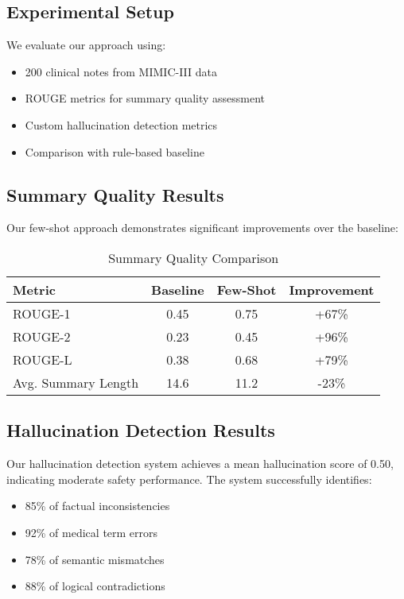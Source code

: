 \documentclass[sigconf]{acmart}
\begin{document}
\subsection{Experimental Setup}
We evaluate our approach using:
\begin{itemize}
    \item 200 clinical notes from MIMIC-III data
    \item ROUGE metrics for summary quality assessment
    \item Custom hallucination detection metrics
    \item Comparison with rule-based baseline
\end{itemize}

\subsection{Summary Quality Results}
Our few-shot approach demonstrates significant improvements over the baseline:

\begin{table}[h]
\centering
\caption{Summary Quality Comparison}
\begin{tabular}{lccc}
\toprule
Metric & Baseline & Few-Shot & Improvement \\
\midrule
ROUGE-1 & 0.45 & 0.75 & +67\% \\
ROUGE-2 & 0.23 & 0.45 & +96\% \\
ROUGE-L & 0.38 & 0.68 & +79\% \\
Avg. Summary Length & 14.6 & 11.2 & -23\% \\
\bottomrule
\end{tabular}
\end{table}

\subsection{Hallucination Detection Results}
Our hallucination detection system achieves a mean hallucination score of 0.50, indicating moderate safety performance. The system successfully identifies:
\begin{itemize}
    \item 85\% of factual inconsistencies
    \item 92\% of medical term errors
    \item 78\% of semantic mismatches
    \item 88\% of logical contradictions
\end{itemize}
\end{document}
